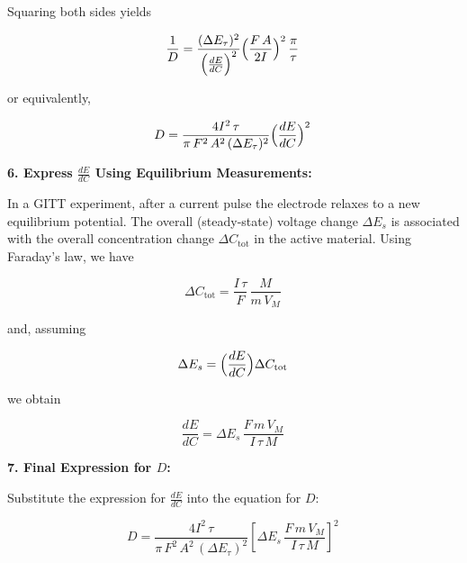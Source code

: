 \documentclass{article}
\begin{document}
Squaring both sides yields

\begin{equation}\label{eq:con:11}
\frac{1}{D} = \frac{(\Delta E_\tau)^2}{\Bigl(\frac{dE}{dC}\Bigr)^2}\Bigl(\frac{F\,A}{2I}\Bigr)^2\,\frac{\pi}{\tau}\,
\end{equation}

or equivalently,

\begin{equation}\label{eq:con:12}
D = \frac{4I^2\,\tau}{\pi\,F^2\,A^2\,(\Delta E_\tau)^2}\Bigl(\frac{dE}{dC}\Bigr)^2\,
\end{equation}

\vspace{1ex}
\textbf{6. Express \(\frac{dE}{dC}\) Using Equilibrium Measurements:}

In a GITT experiment, after a current pulse the electrode relaxes to a new equilibrium potential. The overall (steady-state) voltage change \(\Delta E_s\) is associated with the overall concentration change \(\Delta C_\text{tot}\) in the active material. Using Faraday’s law, we have

\begin{equation}\label{eq:con:13}
\Delta C_\text{tot} = \frac{I\,\tau}{F}\,\frac{M}{m\,V_M}\,
\end{equation}

and, assuming

\begin{equation}\label{eq:con:14}
\Delta E_s = \Bigl(\frac{dE}{dC}\Bigr)\Delta C_\text{tot}\,
\end{equation}

we obtain

\begin{equation}\label{eq:con:15}
\frac{dE}{dC} = \Delta E_s\,\frac{F\,m\,V_M}{I\,\tau\,M}\,
\end{equation}

\vspace{1ex}
\textbf{7. Final Expression for \(D\):}

Substitute the expression for \(\frac{dE}{dC}\) into the equation for \(D\):

\begin{equation}\label{eq:con:16}
D = \frac{4I^2\,\tau}{\pi\,F^2\,A^2\,(\Delta E_\tau)^2} \left[\Delta E_s\,\frac{F\,m\,V_M}{I\,\tau\,M}\right]^2\,
\end{equation}
\end{document}
